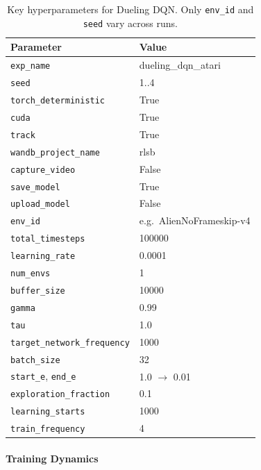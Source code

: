 \begin{table}
	\caption{Key hyperparameters for Dueling DQN. Only \texttt{env\_id} and \texttt{seed} vary across runs.}
	\label{tab:dueling_dqn_hyperparams}
	\centering
	\begin{tabular}{ll}
		\toprule
		\textbf{Parameter} & \textbf{Value} \\
		\midrule
		\texttt{exp\_name}                & dueling\_dqn\_atari \\
		\texttt{seed}                     & 1..4 \\
		\texttt{torch\_deterministic}     & True \\
		\texttt{cuda}                     & True \\
		\texttt{track}                    & True \\
		\texttt{wandb\_project\_name}     & rlsb \\
		\texttt{capture\_video}           & False \\
		\texttt{save\_model}              & True \\
		\texttt{upload\_model}            & False \\
		\texttt{env\_id}                  & e.g.\ AlienNoFrameskip-v4 \\
		\texttt{total\_timesteps}         & 100000 \\
		\texttt{learning\_rate}           & 0.0001 \\
		\texttt{num\_envs}                & 1 \\
		\texttt{buffer\_size}             & 10000 \\
		\texttt{gamma}                    & 0.99 \\
		\texttt{tau}                      & 1.0 \\
		\texttt{target\_network\_frequency} & 1000 \\
		\texttt{batch\_size}             & 32 \\
		\texttt{start\_e}, \texttt{end\_e} & 1.0 $\to$ 0.01 \\
		\texttt{exploration\_fraction}    & 0.1 \\
		\texttt{learning\_starts}         & 1000 \\
		\texttt{train\_frequency}         & 4 \\
		\bottomrule
	\end{tabular}
\end{table}

\paragraph{Training Dynamics}

